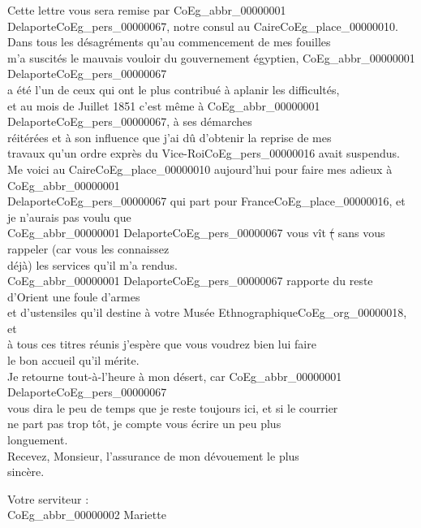 \documentclass{book}
\begin{document}
Cette lettre vous sera remise par \gls{CoEg_abbr_00000001} Delaporte\gls{CoEg_pers_00000067}, notre consul au Caire\gls{CoEg_place_00000010}.\\
\indent Dans tous les désagréments qu’au commencement de mes fouilles\\
m’a suscités le mauvais vouloir du gouvernement égyptien, \gls{CoEg_abbr_00000001} Delaporte\gls{CoEg_pers_00000067}\\
a été l’un de ceux qui ont le plus contribué à aplanir les difficultés,\\
et au mois de Juillet 1851 c’est même à \gls{CoEg_abbr_00000001} Delaporte\gls{CoEg_pers_00000067}, à ses démarches\\
réitérées et à son influence que j’ai dû d’obtenir la reprise de mes\\
travaux qu’un ordre exprès du Vice-Roi\gls{CoEg_pers_00000016} avait suspendus.\\
\indent Me voici au Caire\gls{CoEg_place_00000010} aujourd’hui pour faire mes adieux à \gls{CoEg_abbr_00000001}\\
Delaporte\gls{CoEg_pers_00000067} qui part pour France\gls{CoEg_place_00000016}, et je n’aurais pas voulu que\\
\gls{CoEg_abbr_00000001} Delaporte\gls{CoEg_pers_00000067} vous vît \sout{(} sans vous rappeler (car vous les connaissez\\
déjà) les services qu’il m’a rendus.\\
\indent \gls{CoEg_abbr_00000001} Delaporte\gls{CoEg_pers_00000067} rapporte du reste d’Orient une foule d’armes\\
et d’ustensiles qu’il destine à votre Musée Ethnographique\gls{CoEg_org_00000018}, et\\
à tous ces titres réunis j’espère que vous voudrez bien lui faire\\
le bon accueil qu’il mérite.\\
\indent Je retourne tout-à-l’heure à mon désert, car \gls{CoEg_abbr_00000001} Delaporte\gls{CoEg_pers_00000067}\\
vous dira le peu de temps que je reste toujours ici, et si le courrier\\
ne part pas trop tôt, je compte vous écrire un peu plus\\
longuement.\\
\indent Recevez, Monsieur, l’assurance de mon dévouement le plus\\
sincère.
\begin{center}\hspace{5cm}Votre serviteur :\\
\hspace{5cm}\gls{CoEg_abbr_00000002} Mariette\end{center}
\end{document}
